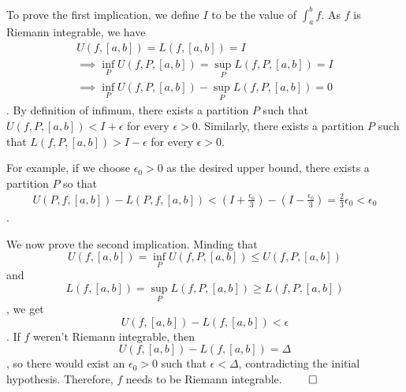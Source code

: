 \documentclass[11pt, a4paper, tikz]{article}
\begin{document}
	To prove the first implication, we define $I$ to be the value of $\int_{a}^{b}f$. As $f$ is Riemann integrable, we have \begin{align*}
		U(f,[a,b])=L(f,[a,b])=I\\
		\implies\inf_PU(f,P,[a,b])=\sup_PL(f,P,[a,b])=I\\ \implies\inf_PU(f,P,[a,b])-\sup_PL(f,P,[a,b])=0
	\end{align*}.
	By definition of infimum, there exists a partition $P$ such that $U(f,P,[a,b])< I+\epsilon$ for every $\epsilon>0$. Similarly, there exists a partition $P$ such that $L(f,P,[a,b])>I-\epsilon$ for every $\epsilon>0$.
	
	For example, if we choose $\epsilon_0>0$ as the desired upper bound, there exists a partition $P$ so that
	\begin{align*}
		U(P,f,[a,b])-L(P,f,[a,b])<(I+\frac{\epsilon_0}{3})-(I-\frac{\epsilon_0}{3})=\frac{2}{3}\epsilon_0 < \epsilon_0
	\end{align*}.
	
	We now prove the second implication. Minding that \[U(f,[a,b])=\inf_PU(f,P,[a,b])\leq U(f,P,[a,b])\] and \[L(f,[a,b])=\sup_PL(f,P,[a,b])\geq L(f,P,[a,b])\], we get \[U(f,[a,b])-L(f,[a,b])<\epsilon\]. If $f$ weren't Riemann integrable, then \[U(f,[a,b])-L(f,[a,b])=\Delta\], so there would exist an $\epsilon_0>0$ such that $\epsilon<\Delta$, contradicting the initial hypothesis. Therefore, $f$ needs to be Riemann integrable.
	$\qed$
\end{document}
